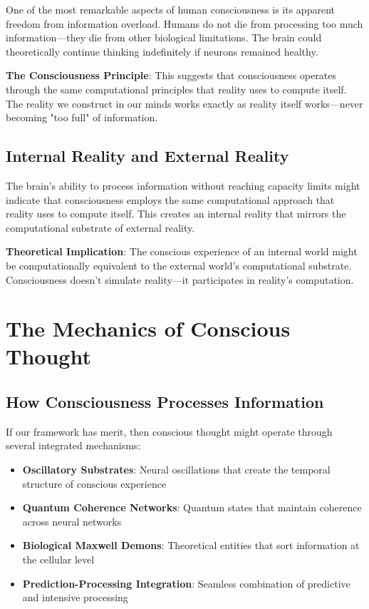 \documentclass[12pt]{article}
\begin{document}
One of the most remarkable aspects of human consciousness is its apparent freedom from information overload. Humans do not die from processing too much information—they die from other biological limitations. The brain could theoretically continue thinking indefinitely if neurons remained healthy.

\textbf{The Consciousness Principle}: This suggests that consciousness operates through the same computational principles that reality uses to compute itself. The reality we construct in our minds works exactly as reality itself works—never becoming "too full" of information.

\subsection{Internal Reality and External Reality}

The brain's ability to process information without reaching capacity limits might indicate that consciousness employs the same computational approach that reality uses to compute itself. This creates an internal reality that mirrors the computational substrate of external reality.

\textbf{Theoretical Implication}: The conscious experience of an internal world might be computationally equivalent to the external world's computational substrate. Consciousness doesn't simulate reality—it participates in reality's computation.

\section{The Mechanics of Conscious Thought}

\subsection{How Consciousness Processes Information}

If our framework has merit, then conscious thought might operate through several integrated mechanisms:

\begin{itemize}
\item \textbf{Oscillatory Substrates}: Neural oscillations that create the temporal structure of conscious experience
\item \textbf{Quantum Coherence Networks}: Quantum states that maintain coherence across neural networks
\item \textbf{Biological Maxwell Demons}: Theoretical entities that sort information at the cellular level
\item \textbf{Prediction-Processing Integration}: Seamless combination of predictive and intensive processing
\end{itemize}
\end{document}
